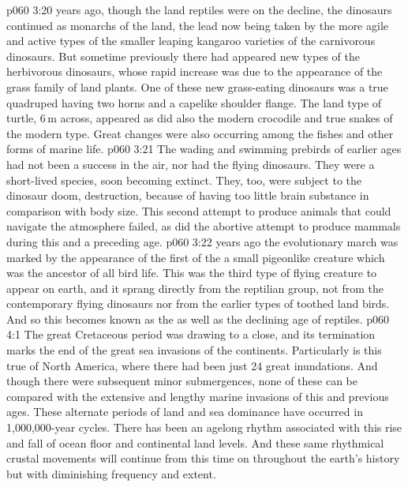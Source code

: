 \vs p060 3:20 \pc {} years ago, though the land reptiles were on the decline, the dinosaurs continued as monarchs of the land, the lead now being taken by the more agile and active types of the smaller leaping kangaroo varieties of the carnivorous dinosaurs. But sometime previously there had appeared new types of the herbivorous dinosaurs, whose rapid increase was due to the appearance of the grass family of land plants. One of these new grass\hyp{}eating dinosaurs was a true quadruped having two horns and a capelike shoulder flange. The land type of turtle, 6\,m across, appeared as did also the modern crocodile and true snakes of the modern type. Great changes were also occurring among the fishes and other forms of marine life.
\vs p060 3:21 The wading and swimming prebirds of earlier ages had not been a success in the air, nor had the flying dinosaurs. They were a short\hyp{}lived species, soon becoming extinct. They, too, were subject to the dinosaur doom, destruction, because of having too little brain substance in comparison with body size. This second attempt to produce animals that could navigate the atmosphere failed, as did the abortive attempt to produce mammals during this and a preceding age.
\vs p060 3:22 \pc {} years ago the evolutionary march was marked by the  appearance of the first of the  a small pigeonlike creature which was the ancestor of all bird life. This was the third type of flying creature to appear on earth, and it sprang directly from the reptilian group, not from the contemporary flying dinosaurs nor from the earlier types of toothed land birds. And so this becomes known as the  as well as the declining age of reptiles.
\vs p060 4:1 The great Cretaceous period was drawing to a close, and its termination marks the end of the great sea invasions of the continents. Particularly is this true of North America, where there had been just 24 great inundations. And though there were subsequent minor submergences, none of these can be compared with the extensive and lengthy marine invasions of this and previous ages. These alternate periods of land and sea dominance have occurred in 1,000,000\hyp{}year cycles. There has been an agelong rhythm associated with this rise and fall of ocean floor and continental land levels. And these same rhythmical crustal movements will continue from this time on throughout the earth’s history but with diminishing frequency and extent.
